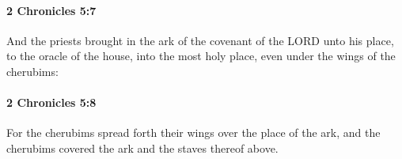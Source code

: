		\paragraph{2 Chronicles 5:7} %
			\label{2CHRONICLES-5-7}

			And the priests brought in the ark of the covenant of the LORD unto his place, to the oracle of the house, into the most holy place, even under the wings of the cherubims:


		\paragraph{2 Chronicles 5:8} %
			\label{2CHRONICLES-5-8}

			For the cherubims spread forth their wings over the place of the ark, and the cherubims covered the ark and the staves thereof above.


